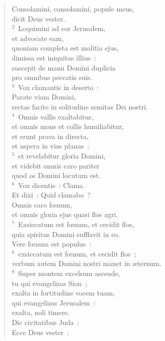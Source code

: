 \begin{flushleft}\begin{verse}\vspace{-19pt}\hspace{6pt}Consolamini, consolamini, popule meus,\\\hspace{6pt} dicit Deus vester.\\
${}^{2}$~Loquimini ad cor Jerusalem,\\ et advocate eam,\\ quoniam completa est malitia ejus,\\ dimissa est iniquitas illius~:\\ suscepit de manu Domini duplicia\\ pro omnibus peccatis suis.\\
${}^{3}$~Vox clamantis in deserto~:\\ Parate viam Domini,\\ rectas facite in solitudine semitas Dei nostri.\\
${}^{4}$~Omnis vallis exaltabitur,\\ et omnis mons et collis humiliabitur,\\ et erunt prava in directa,\\ et aspera in vias planas~:\\
${}^{5}$~et revelabitur gloria Domini,\\ et videbit omnis caro pariter\\ quod os Domini locutum est.\\
${}^{6}$~Vox dicentis~: Clama.\\ Et dixi~: Quid clamabo~?\\ Omnis caro fœnum,\\ et omnis gloria ejus quasi flos agri.\\
${}^{7}$~Exsiccatum est fœnum, et cecidit flos,\\ quia spiritus Domini sufflavit in eo.\\ Vere fœnum est populus~:\\
${}^{8}$~exsiccatum est fœnum, et cecidit flos~;\\ verbum autem Domini nostri manet in \ae ternum.\\
${}^{9}$~Super montem excelsum ascende,\\ tu qui evangelizas Sion~;\\ exalta in fortitudine vocem tuam,\\ qui evangelizas Jerusalem~:\\ exalta, noli timere.\\ Dic civitatibus Juda~:\\ Ecce Deus vester~:\\

\end{verse}
\end{flushleft}
